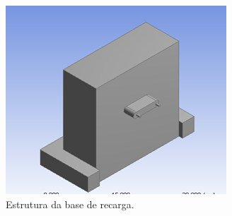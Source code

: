 		\begin{figure}[H]
			\centering
			\includegraphics[scale=0.8]{figuras/estrutura_base.png}
			\caption{Estrutura da base de recarga.}
			\label{img:estrutura_base}
		\end{figure}	
	

